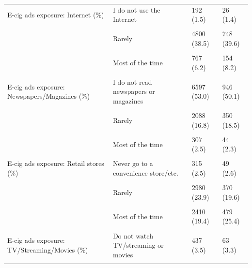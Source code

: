 \begin{longtable}[t]{>{\raggedright\arraybackslash}p{4.5cm}>{\raggedright\arraybackslash}p{5cm}ll}
E-cig ads exposure: Internet (\%) & I do not use the Internet & 192 (1.5) & 26 (1.4)\\
\cellcolor{gray!6}{} & \cellcolor{gray!6}{Never} & \cellcolor{gray!6}{3278 (26.3)} & \cellcolor{gray!6}{357 (18.9)}\\
 & Rarely & 4800 (38.5) & 748 (39.6)\\
\cellcolor{gray!6}{} & \cellcolor{gray!6}{Sometimes} & \cellcolor{gray!6}{3070 (24.7)} & \cellcolor{gray!6}{553 (29.3)}\\
\addlinespace
 & Most of the time & 767 (6.2) & 154 (8.2)\\
\cellcolor{gray!6}{} & \cellcolor{gray!6}{Always} & \cellcolor{gray!6}{347 (2.8)} & \cellcolor{gray!6}{50 (2.6)}\\
E-cig ads exposure: Newspapers/Magazines (\%) & I do not read newspapers or magazines & 6597 (53.0) & 946 (50.1)\\
\cellcolor{gray!6}{} & \cellcolor{gray!6}{Never} & \cellcolor{gray!6}{2107 (16.9)} & \cellcolor{gray!6}{345 (18.3)}\\
 & Rarely & 2088 (16.8) & 350 (18.5)\\
\addlinespace
\cellcolor{gray!6}{} & \cellcolor{gray!6}{Sometimes} & \cellcolor{gray!6}{1194 (9.6)} & \cellcolor{gray!6}{181 (9.6)}\\
 & Most of the time & 307 (2.5) & 44 (2.3)\\
\cellcolor{gray!6}{} & \cellcolor{gray!6}{Always} & \cellcolor{gray!6}{161 (1.3)} & \cellcolor{gray!6}{22 (1.2)}\\
E-cig ads exposure: Retail stores (\%) & Never go to a convenience store/etc. & 315 (2.5) & 49 (2.6)\\
\cellcolor{gray!6}{} & \cellcolor{gray!6}{Never} & \cellcolor{gray!6}{2336 (18.8)} & \cellcolor{gray!6}{192 (10.2)}\\
\addlinespace
 & Rarely & 2980 (23.9) & 370 (19.6)\\
\cellcolor{gray!6}{} & \cellcolor{gray!6}{Sometimes} & \cellcolor{gray!6}{3291 (26.4)} & \cellcolor{gray!6}{534 (28.3)}\\
 & Most of the time & 2410 (19.4) & 479 (25.4)\\
\cellcolor{gray!6}{} & \cellcolor{gray!6}{Always} & \cellcolor{gray!6}{1122 (9.0)} & \cellcolor{gray!6}{264 (14.0)}\\
E-cig ads exposure: TV/Streaming/Movies (\%) & Do not watch TV/streaming or movies & 437 (3.5) & 63 (3.3)\\
\addlinespace
\cellcolor{gray!6}{} & \cellcolor{gray!6}{Never} & \cellcolor{gray!6}{5812 (46.7)} & \cellcolor{gray!6}{832 (44.1)}\\

\end{longtable}
